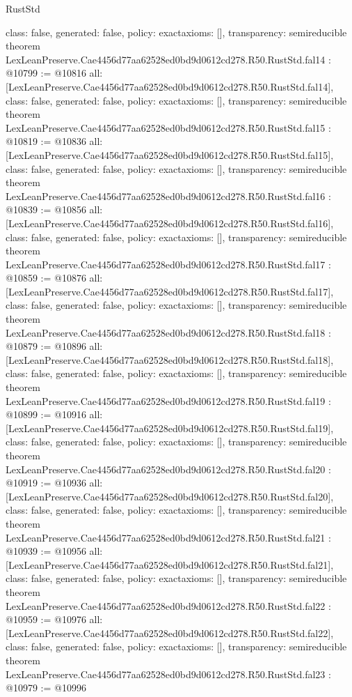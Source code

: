 \begin{lexlean}{RustStd}
\begin{coremodule}
{  class: false,
  generated: false,
  policy: exact{axioms: []},
  transparency: semireducible
}
theorem LexLeanPreserve.Cae4456d77aa62528ed0bd9d0612cd278.R50.RustStd.fal14 : @10799 := @10816 {
  all: [LexLeanPreserve.Cae4456d77aa62528ed0bd9d0612cd278.R50.RustStd.fal14],
  class: false,
  generated: false,
  policy: exact{axioms: []},
  transparency: semireducible
}
theorem LexLeanPreserve.Cae4456d77aa62528ed0bd9d0612cd278.R50.RustStd.fal15 : @10819 := @10836 {
  all: [LexLeanPreserve.Cae4456d77aa62528ed0bd9d0612cd278.R50.RustStd.fal15],
  class: false,
  generated: false,
  policy: exact{axioms: []},
  transparency: semireducible
}
theorem LexLeanPreserve.Cae4456d77aa62528ed0bd9d0612cd278.R50.RustStd.fal16 : @10839 := @10856 {
  all: [LexLeanPreserve.Cae4456d77aa62528ed0bd9d0612cd278.R50.RustStd.fal16],
  class: false,
  generated: false,
  policy: exact{axioms: []},
  transparency: semireducible
}
theorem LexLeanPreserve.Cae4456d77aa62528ed0bd9d0612cd278.R50.RustStd.fal17 : @10859 := @10876 {
  all: [LexLeanPreserve.Cae4456d77aa62528ed0bd9d0612cd278.R50.RustStd.fal17],
  class: false,
  generated: false,
  policy: exact{axioms: []},
  transparency: semireducible
}
theorem LexLeanPreserve.Cae4456d77aa62528ed0bd9d0612cd278.R50.RustStd.fal18 : @10879 := @10896 {
  all: [LexLeanPreserve.Cae4456d77aa62528ed0bd9d0612cd278.R50.RustStd.fal18],
  class: false,
  generated: false,
  policy: exact{axioms: []},
  transparency: semireducible
}
theorem LexLeanPreserve.Cae4456d77aa62528ed0bd9d0612cd278.R50.RustStd.fal19 : @10899 := @10916 {
  all: [LexLeanPreserve.Cae4456d77aa62528ed0bd9d0612cd278.R50.RustStd.fal19],
  class: false,
  generated: false,
  policy: exact{axioms: []},
  transparency: semireducible
}
theorem LexLeanPreserve.Cae4456d77aa62528ed0bd9d0612cd278.R50.RustStd.fal20 : @10919 := @10936 {
  all: [LexLeanPreserve.Cae4456d77aa62528ed0bd9d0612cd278.R50.RustStd.fal20],
  class: false,
  generated: false,
  policy: exact{axioms: []},
  transparency: semireducible
}
theorem LexLeanPreserve.Cae4456d77aa62528ed0bd9d0612cd278.R50.RustStd.fal21 : @10939 := @10956 {
  all: [LexLeanPreserve.Cae4456d77aa62528ed0bd9d0612cd278.R50.RustStd.fal21],
  class: false,
  generated: false,
  policy: exact{axioms: []},
  transparency: semireducible
}
theorem LexLeanPreserve.Cae4456d77aa62528ed0bd9d0612cd278.R50.RustStd.fal22 : @10959 := @10976 {
  all: [LexLeanPreserve.Cae4456d77aa62528ed0bd9d0612cd278.R50.RustStd.fal22],
  class: false,
  generated: false,
  policy: exact{axioms: []},
  transparency: semireducible
}
theorem LexLeanPreserve.Cae4456d77aa62528ed0bd9d0612cd278.R50.RustStd.fal23 : @10979 := @10996 {
}
\end{coremodule}
\end{lexlean}
